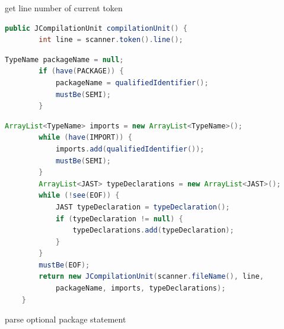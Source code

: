 \documentclass[8pt,a4paper,compress]{beamer}
\begin{document}
\begin{frame}[fragile]
\begin{overprint}
\begin{tcolorbox}[enhanced,drop shadow southwest,sharp corners,size=fbox,colback=white,fontlower=\small\ttfamily,collower=silver900]
\tcblower
\begin{minipage}[t][.25cm][t]{\textwidth}
get line number of current token
\end{minipage}
\end{tcolorbox}

\begin{tcolorbox}[enhanced,drop shadow southwest,sharp corners,size=fbox,colback=white,fontlower=\small\ttfamily,collower=silver900]

\begin{lstlisting}[language=Java,style=focusout]
    public JCompilationUnit compilationUnit() {
        int line = scanner.token().line();
\end{lstlisting}
\begin{lstlisting}[language=Java,style=focusin,backgroundcolor=\color{lime100}]
        TypeName packageName = null;
        if (have(PACKAGE)) {
            packageName = qualifiedIdentifier();
            mustBe(SEMI);
        }
\end{lstlisting}
\begin{lstlisting}[language=Java,style=focusout]
        ArrayList<TypeName> imports = new ArrayList<TypeName>();
        while (have(IMPORT)) {
            imports.add(qualifiedIdentifier());
            mustBe(SEMI);
        }
        ArrayList<JAST> typeDeclarations = new ArrayList<JAST>();
        while (!see(EOF)) {
            JAST typeDeclaration = typeDeclaration();
            if (typeDeclaration != null) {
                typeDeclarations.add(typeDeclaration);
            }
        }
        mustBe(EOF);
        return new JCompilationUnit(scanner.fileName(), line, 
            packageName, imports, typeDeclarations);
    }
\end{lstlisting}

\tcblower
\begin{minipage}[t][.25cm][t]{\textwidth}
parse optional package statement
\end{minipage}
\end{tcolorbox}

\begin{tcolorbox}[enhanced,drop shadow southwest,sharp corners,size=fbox,colback=white,fontlower=\small\ttfamily,collower=silver900]


\end{tcolorbox}
\end{overprint}
\end{frame}
\end{document}
